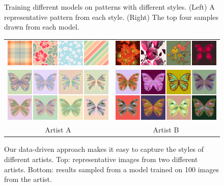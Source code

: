 \begin{figure}[t]
\caption{Training different models on patterns with different styles. (Left) A representative pattern from each style. (Right) The top four samples drawn from each model.}
\label{fig:styleTraining}
\vspace{-1.0em}
\end{figure}

\begin{figure}[ht]
\centering
\begin{tabular}{cc} 
\includegraphics[width=.44\linewidth]{figs/styleSugarExamples2}&\includegraphics[width=.44\linewidth]{figs/styleAlbenajExamples2}\vspace{1.0em}\\
\includegraphics[width=.44\linewidth]{figs/styleSugar2}&\includegraphics[width=.44\linewidth]{figs/styleAlbenaj2}\\
Artist A&Artist B\\
\end{tabular}

\caption{Our data-driven approach makes it easy to capture the styles of different artists. Top: representative images from two different artists. Bottom: results sampled from a model trained on 100 images from the artist.}
\vspace{-1.0em}
\label{fig:artistTraining}
\end{figure}

